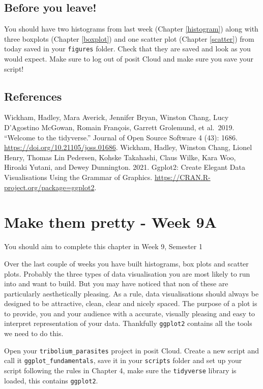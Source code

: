 \documentclass[
]{book}
\begin{document}
\hypertarget{before-you-leave-3}{%
\section{Before you leave!}\label{before-you-leave-3}}

You should have two histograms from last week (Chapter \ref{histogram}) along with three boxplots (Chapter \ref{boxplot}) and one scatter plot (Chapter \ref{scatter}) from today saved in your \texttt{figures} folder. Check that they are saved and look as you would expect. Make sure to log out of posit Cloud and make sure you save your script!

\hypertarget{references-4}{%
\section{References}\label{references-4}}

Wickham, Hadley, Mara Averick, Jennifer Bryan, Winston Chang, Lucy D'Agostino McGowan, Romain François, Garrett Grolemund, et al.~2019. ``Welcome to the tidyverse.'' Journal of Open Source Software 4 (43): 1686. \url{https://doi.org/10.21105/joss.01686}.
Wickham, Hadley, Winston Chang, Lionel Henry, Thomas Lin Pedersen, Kohske Takahashi, Claus Wilke, Kara Woo, Hiroaki Yutani, and Dewey Dunnington. 2021. Ggplot2: Create Elegant Data Visualisations Using the Grammar of Graphics. \url{https://CRAN.R-project.org/package=ggplot2}.

\hypertarget{pretty-figs-p1}{%
\chapter{Make them pretty - Week 9A}\label{pretty-figs-p1}}

You should aim to complete this chapter in Week 9, Semester 1

Over the last couple of weeks you have built histograms, box plots and scatter plots. Probably the three types of data visualisation you are most likely to run into and want to build. But you may have noticed that non of these are particularly aesthetically pleasing. As a rule, data visualisations should always be designed to be attractive, clean, clear and nicely spaced. The purpose of a plot is to provide, you and your audience with a accurate, visually pleasing and easy to interpret representation of your data. Thankfully \texttt{ggplot2} contains all the tools we need to do this.

Open your \texttt{tribolium\_parasites} project in posit Cloud. Create a new script and call it \texttt{ggplot\_fundamentals}, save it in your \texttt{scripts} folder and set up your script following the rules in Chapter 4, make sure the \texttt{tidyverse} library is loaded, this contains \texttt{ggplot2}.
\end{document}
